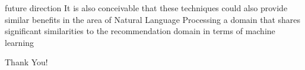 \documentclass{beamer}
\begin{document}
\begin{frame}{future direction}
    It is also conceivable that these techniques could also provide similar benefits in the area of Natural Language Processing a domain that shares significant similarities to the recommendation domain in terms of machine learning

\end{frame}

\begin{frame}
\begin{center}
    Thank You!
\end{center}
\end{frame} 
\end{document}

